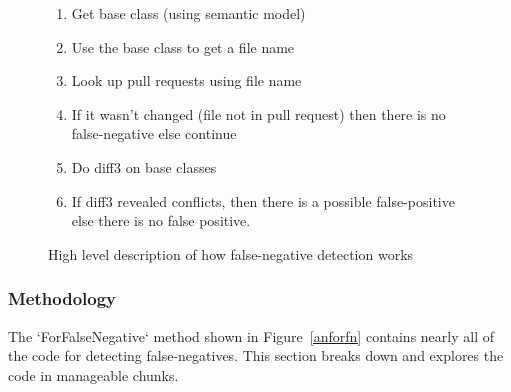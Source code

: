 \documentclass[draftclsnofoot,onecolumn]{IEEEtran}
\begin{document}
\begin{figure}[!htb]
\centering
\begin{enumerate}
    \item Get base class (using semantic model)
    \item Use the base class to get a file name
    \item Look up pull requests using file name
    \item If it wasn’t changed (file not in pull request) then there is no 
false-negative else continue
    \item Do diff3 on base classes
    \item If diff3 revealed conflicts, then there is a possible false-positive 
else there is no false positive.
\end{enumerate}
\caption{High level description of how false-negative detection works}
\label{fnalgore}
\end{figure}

\subsubsection{Methodology}
The `ForFalseNegative` method shown in Figure~\ref{anforfn} contains nearly all 
of the code for detecting false-negatives. This section breaks down and 
explores the code in manageable chunks.
\end{document}
